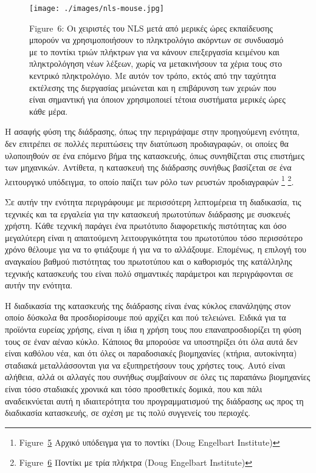 \documentclass[
]{article}
\begin{document}
\leavevmode{}%
\begin{figure}
\hypertarget{fig:nls-mouse}{%
\centering
\texttt{[image: ./images/nls-mouse.jpg]}
\caption{Figure~6: Οι χειριστές του NLS μετά από μερικές ώρες
εκπαίδευσης μπορούν να χρησιμοποιήσουν το πληκτρολόγιο ακόρντων σε
συνδυασμό με το ποντίκι τριών πλήκτρων για να κάνουν επεξεργασία
κειμένου και πληκτρολόγηση νέων λέξεων, χωρίς να μετακινήσουν τα χέρια
τους στο κεντρικό πληκτρολόγιο. Με αυτόν τον τρόπο, εκτός από την
ταχύτητα εκτέλεσης της διεργασίας μειώνεται και η επιβάρυνση των χεριών
που είναι σημαντική για όποιον χρησιμοποιεί τέτοια συστήματα μερικές
ώρες κάθε μέρα.}\label{fig:nls-mouse}
}
\end{figure}

Η ασαφής φύση της διάδρασης, όπως την περιγράψαμε στην προηγούμενη
ενότητα, δεν επιτρέπει σε πολλές περιπτώσεις την διατύπωση προδιαγραφών,
οι οποίες θα υλοποιηθούν σε ένα επόμενο βήμα της κατασκευής, όπως
συνηθίζεται στις επιστήμες των μηχανικών. Αντίθετα, η κατασκευή της
διάδρασης συνήθως βασίζεται σε ένα λειτουργικό υπόδειγμα, το οποίο
παίζει των ρόλο των ρευστών προδιαγραφών \footnote{Figure~\protect\hyperlink{fig:engelbart-mouse}{5}
  Αρχικό υπόδειγμα για το ποντίκι (Doug Engelbart Institute)}
\footnote{Figure~\protect\hyperlink{fig:nls-mouse}{6} Ποντίκι με τρία
  πλήκτρα (Doug Engelbart Institute)}.

Σε αυτήν την ενότητα περιγράφουμε με περισσότερη λεπτομέρεια τη
διαδικασία, τις τεχνικές και τα εργαλεία για την κατασκευή πρωτοτύπων
διάδρασης με συσκευές χρήστη. Κάθε τεχνική παράγει ένα πρωτότυπο
διαφορετικής πιστότητας και όσο μεγαλύτερη είναι η απαιτούμενη
λειτουργικότητα του πρωτοτύπου τόσο περισσότερο χρόνο θέλουμε για να το
φτιάξουμε ή για να το αλλάξουμε. Επομένως, η επιλογή του αναγκαίου
βαθμού πιστότητας του πρωτοτύπου και ο καθορισμός της κατάλληλης
τεχνικής κατασκευής του είναι πολύ σημαντικές παράμετροι και
περιγράφονται σε αυτήν την ενότητα.

Η διαδικασία της κατασκευής της διάδρασης είναι ένας κύκλος επανάληψης
στον οποίο δύσκολα θα προσδιορίσουμε πού αρχίζει και πού τελειώνει.
Ειδικά για τα προϊόντα ευρείας χρήσης, είναι η ίδια η χρήση τους που
επαναπροσδιορίζει τη φύση τους σε έναν αέναο κύκλο. Κάποιος θα μπορούσε
να υποστηρίξει ότι όλα αυτά δεν είναι καθόλου νέα, και ότι όλες οι
παραδοσιακές βιομηχανίες (κτήρια, αυτοκίνητα) σταδιακά μεταλλάσσονται
για να εξυπηρετήσουν τους χρήστες τους. Αυτό είναι αλήθεια, αλλά οι
αλλαγές που συνήθως συμβαίνουν σε όλες τις παραπάνω βιομηχανίες είναι
τόσο σταδιακές χρονικά και τόσο προσθετικές δομικά, που και πάλι
αναδεικνύεται αυτή η ιδιαιτερότητα του προγραμματισμού της διάδρασης ως
προς τη διαδικασία κατασκευής, σε σχέση με τις πολύ συγγενείς του
περιοχές.
\end{document}

